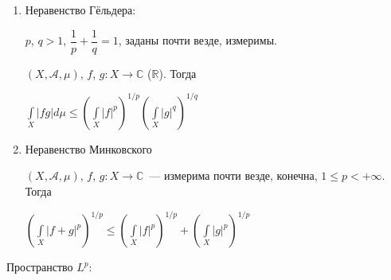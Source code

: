\documentclass{article}
\begin{document}
        \begin{enumerate}
        
            \item Неравенство Гёльдера:
        
                $p$, $q > 1$, $\dfrac{1}{p} + \dfrac{1}{q} = 1$, заданы почти везде, измеримы.
            
                $(X, \mathcal{A}, \mu)$, $f$, $g : X \rightarrow \mathbb{C}$ ($\mathbb{R}$). Тогда
            
                $\int\limits_X |fg| d \mu \leqslant \left( \int\limits_X |f|^p \right)^{1/p} \left( \int\limits_X |g|^q \right)^{1/q}$
            
            \item Неравенство Минковского
        
                $(X, \mathcal{A}, \mu)$, $f$, $g : X \rightarrow \mathbb{C}$~--- измерима почти везде, конечна, $1 \leqslant p < +\infty$. Тогда
            
                $\left( \int\limits_X |f + g|^p \right)^{1/p} \leqslant \left( \int\limits_X |f|^p \right)^{1/p} + \left( \int\limits_X |g|^p \right)^{1/p}$
            
        \end{enumerate}
        
    \newpage

    Пространство $L^p$:
    
\end{document}
